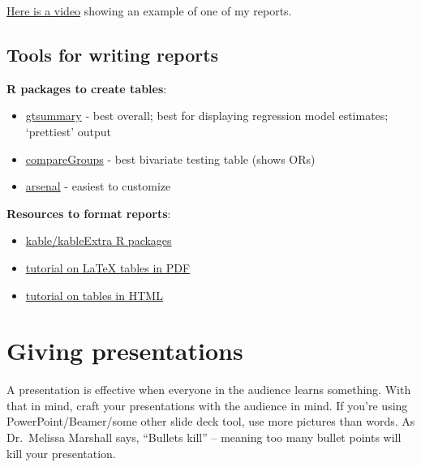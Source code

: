 \documentclass[
]{book}
\begin{document}
\href{https://youtu.be/Bs6EYlw6di0}{Here is a video} showing an example of one of my reports.

\hypertarget{tables}{%
\section{Tools for writing reports}\label{tables}}

\textbf{R packages to create tables}:

\begin{itemize}
\item
  \href{https://www.danieldsjoberg.com/gtsummary/}{gtsummary} - best overall; best for displaying regression model estimates; `prettiest' output
\item
  \href{https://cran.r-project.org/web/packages/compareGroups/vignettes/compareGroups_vignette.html}{compareGroups} - best bivariate testing table (shows ORs)
\item
  \href{https://cran.r-project.org/web/packages/arsenal/vignettes/tableby.html}{arsenal} - easiest to customize
\end{itemize}

\textbf{Resources to format reports}:

\begin{itemize}
\item
  \href{https://bookdown.org/yihui/rmarkdown-cookbook/kableextra.html}{kable/kableExtra R packages}
\item
  \href{https://cran.r-project.org/web/packages/kableExtra/vignettes/awesome_table_in_pdf.pdf}{tutorial on LaTeX tables in PDF}
\item
  \href{https://cran.r-project.org/web/packages/kableExtra/vignettes/awesome_table_in_html.html}{tutorial on tables in HTML}
\end{itemize}

\hypertarget{giving-presentations}{%
\chapter{Giving presentations}\label{giving-presentations}}

A presentation is effective when everyone in the audience learns something. With that in mind, craft your presentations with the audience in mind. If you're using PowerPoint/Beamer/some other slide deck tool, use more pictures than words. As Dr.~Melissa Marshall says, ``Bullets kill'' -- meaning too many bullet points will kill your presentation.
\end{document}
